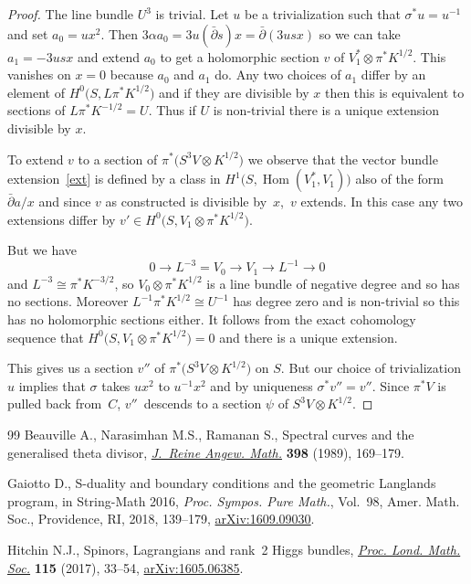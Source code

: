 \documentclass[11pt]{article}
\numberwithin{equation}{section}
\def\Hom{\operatorname{Hom}}
\begin{document}
\begin{proof}
The line bundle $U^3$ is trivial. Let $u$ be a trivialization such that $\sigma^*u=u^{-1}$ and set $a_0=ux^2$. Then
$3\alpha a_0=3u(\bar\partial s) x=\bar\partial (3usx)$
so we can take $a_1=-3usx$ and extend $a_0$ to get a holomorphic section $v$ of $V_1^*\otimes \pi^*K^{1/2}$. This vanishes on $x=0$ because $a_0$ and $a_1$ do. Any two choices of $a_1$ differ by an element of $H^0\big(S, L\pi^*K^{1/2}\big)$ and if they are divisible by $x$ then this is equivalent to sections of $L\pi^*K^{-1/2}=U$. Thus if $U$ is non-trivial there is a unique extension divisible by $x$.

To extend $v$ to a section of $\pi^*\big(S^3V\otimes K^{1/2}\big)$ we observe that the vector bundle extension~\eqref{ext} is defined by a class in $H^1\big(S, \Hom(V_1^*,V_1)\big)$ also of the form $\bar\partial a/x$ and since $v$ as constructed is divisible by~$x$,~$v$ extends. In this case any two extensions differ by $v'\in H^0\big(S,V_1\otimes \pi^*K^{1/2}\big)$.

But we have
 \begin{displaymath}0\rightarrow L^{-3}=V_{0}\rightarrow V_{1}\rightarrow L^{-1}\rightarrow 0\end{displaymath}
and $L^{-3}\cong \pi^*K^{-3/2}$, so $V_0\otimes \pi^*K^{1/2}$ is a line bundle of negative degree and so has no sections. Moreover $L^{-1}\pi^*K^{1/2} \cong U^{-1}$ has degree zero and is non-trivial so this has no holomorphic sections either. It follows from the exact cohomology sequence that $H^0\big(S, V_1\otimes \pi^*K^{1/2}\big)=0$ and there is a unique extension.

 This gives us a section $v''$ of $\pi^*\big(S^3V\otimes K^{1/2}\big)$ on $S$. But our choice of trivialization $u$ implies that $\sigma$ takes $ux^2$ to $u^{-1}x^2$ and by uniqueness $\sigma^*v''=v''$. Since $\pi^*V$ is pulled back from~$C$, $v''$~descends to a section $\psi$ of $S^3V\otimes K^{1/2}$.
\end{proof}
\begin{thebibliography}{99}
Beauville A., Narasimhan M.S., Ramanan S., Spectral curves and the generalised
 theta divisor, \href{https://doi.org/10.1515/crll.1989.398.169}{\textit{J.~Reine Angew. Math.}} \textbf{398} (1989), 169--179.

Gaiotto D., S-duality and boundary conditions and the geometric {L}anglands
 program, in String-{M}ath 2016, \textit{Proc. Sympos. Pure Math.}, Vol.~98,
 Amer. Math. Soc., Providence, RI, 2018, 139--179, \href{https://arxiv.org/abs/1609.09030}{arXiv:1609.09030}.

Hitchin N.J., Spinors, {L}agrangians and rank~2 {H}iggs bundles, \href{https://doi.org/10.1112/plms.12034}{\textit{Proc.
 Lond. Math. Soc.}} \textbf{115} (2017), 33--54, \href{https://arxiv.org/abs/1605.06385}{arXiv:1605.06385}.

\end{thebibliography}
\end{document}
